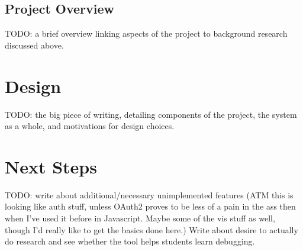 \documentclass[12pt]{article}
\begin{document}
\subsection{Project Overview}

TODO: a brief overview linking aspects of the project to background
research discussed above.

\section{Design}

TODO: the big piece of writing, detailing components of the project,
the system as a whole, and motivations for design choices.

\section{Next Steps}

TODO: write about additional/necessary unimplemented features (ATM
this is looking like auth stuff, unless OAuth2 proves to be less of a
pain in the ass then when I've used it before in Javascript.  Maybe
some of the vis stuff as well, though I'd really like to get the
basics done here.)  Write about desire to actually do research and see
whether the tool helps students learn debugging.

\pagebreak

{}
\end{document}
